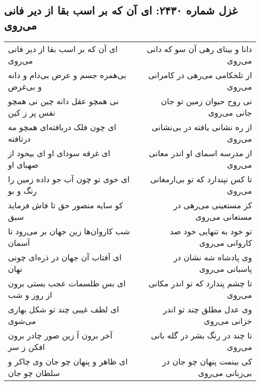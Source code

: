 \begin{center}
\section*{غزل شماره ۲۴۳۰: ای آن که بر اسب بقا از دیر فانی می‌روی}
\label{sec:2430}
\begin{longtable}{l p{0.5cm} r}
ای آن که بر اسب بقا از دیر فانی می‌روی
&&
دانا و بینای رهی آن سو که دانی می‌روی
\\
بی‌همره جسم و عرض بی‌دام و دانه و بی‌غرض
&&
از تلخکامی می‌رهی در کامرانی می‌روی
\\
نی همچو عقل دانه چین نی همچو نفس پر ز کین
&&
نی روح حیوان زمین تو جان جانی می‌روی
\\
ای چون فلک دربافته‌ای همچو مه درتافته
&&
از ره نشانی یافته در بی‌نشانی می‌روی
\\
ای غرقه سودای او ای بیخود از صهبای او
&&
از مدرسه اسمای او اندر معانی می‌روی
\\
ای خوی تو چون آب جو داده زمین را رنگ و بو
&&
تا کس نپندارد که تو بی‌ارمغانی می‌روی
\\
کو سایه منصور حق تا فاش فرماید سبق
&&
کز مستعینی می‌رهی در مستعانی می‌روی
\\
شب کاروان‌ها زین جهان بر می‌رود تا آسمان
&&
تو خود به تنهایی خود صد کاروانی می‌روی
\\
ای آفتاب آن جهان در ذره‌ای چونی نهان
&&
وی پادشاه شه نشان در پاسبانی می‌روی
\\
ای بس طلسمات عجب بستی برون از روز و شب
&&
تا چشم پندارد که تو اندر مکانی می‌روی
\\
ای لطف غیبی چند تو شکل بهاری می‌شوی
&&
وی عدل مطلق چند تو اندر خزانی می‌روی
\\
آخر برون آ زین صور چادر برون افکن ز سر
&&
تا چند در رنگ بشر در گله بانی می‌روی
\\
ای ظاهر و پنهان چو جان وی چاکر و سلطان چو جان
&&
کی بینمت پنهان چو جان در بی‌زبانی می‌روی
\\
\end{longtable}
\end{center}
